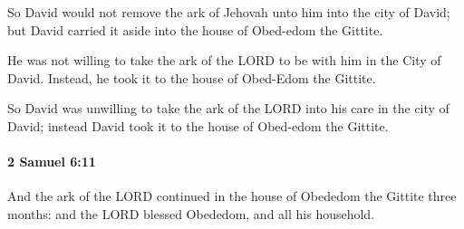 			\begin{versebox}
					\item[BHS] 
					\item[ASV] So David would not remove the ark of Jehovah unto him into the city of David; but David carried it aside into the house of Obed-edom the Gittite.
					\item[NIV] He was not willing to take the ark of the LORD to be with him in the City of David. Instead, he took it to the house of Obed-Edom the Gittite.
					\item[NRSV] So David was unwilling to take the ark of the LORD into his care in the city of David; instead David took it to the house of Obed-edom the Gittite.
			\end{versebox}

		\paragraph{2 Samuel 6:11} %
			\label{2SAMUEL-6-11}

			And the ark of the LORD continued in the house of Obededom the Gittite three months: and the LORD blessed Obededom, and all his household.

